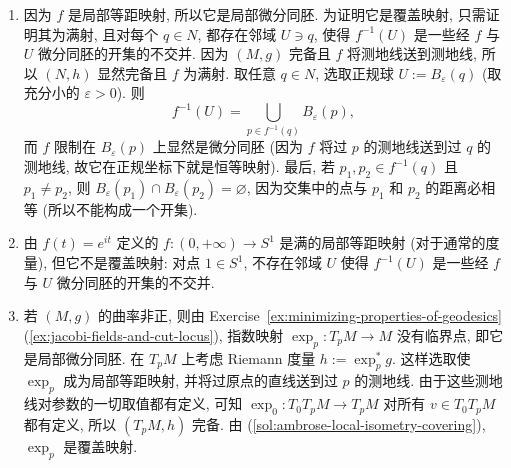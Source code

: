 \begin{description}[font=\normalfont,leftmargin=2em,labelwidth=1.5em]
\begin{enumerate}[label=(\alph*),ref=\alph*,leftmargin=*]
\item\label{sol:ambrose-local-isometry-covering} 因为 $f$ 是局部等距映射, 所以它是局部微分同胚. 为证明它是覆盖映射, 只需证明其为满射, 且对每个 $q\in N$, 都存在邻域 $U\ni q$, 使得 $f^{-1}(U)$ 是一些经 $f$ 与 $U$ 微分同胚的开集的不交并. 因为 $(M,g)$ 完备且 $f$ 将测地线送到测地线, 所以 $(N,h)$ 显然完备且 $f$ 为满射. 取任意 $q\in N$, 选取正规球 $U:=B_\varepsilon(q)$ (取充分小的 $\varepsilon>0$). 则
\[
  f^{-1}(U)=\bigcup_{p\in f^{-1}(q)}B_\varepsilon(p),
\]
而 $f$ 限制在 $B_\varepsilon(p)$ 上显然是微分同胚 (因为 $f$ 将过 $p$ 的测地线送到过 $q$ 的测地线, 故它在正规坐标下就是恒等映射). 最后, 若 $p_1,p_2\in f^{-1}(q)$ 且 $p_1\ne p_2$, 则 $B_\varepsilon(p_1)\cap B_\varepsilon(p_2)=\varnothing$, 因为交集中的点与 $p_1$ 和 $p_2$ 的距离必相等 (所以不能构成一个开集).
\item 由 $f(t)=e^{it}$ 定义的 $f:(0,+\infty)\to S^1$ 是满的局部等距映射 (对于通常的度量), 但它不是覆盖映射: 对点 $1\in S^1$, 不存在邻域 $U$ 使得 $f^{-1}(U)$ 是一些经 $f$ 与 $U$ 微分同胚的开集的不交并.
\item 若 $(M,g)$ 的曲率非正, 则由 Exercise~\ref{ex:minimizing-properties-of-geodesics}(\ref{ex:jacobi-fields-and-cut-locus}), 指数映射 $\exp_p:T_pM\to M$ 没有临界点, 即它是局部微分同胚. 在 $T_pM$ 上考虑 Riemann 度量 $h:=\exp_p^*g$. 这样选取使 $\exp_p$ 成为局部等距映射, 并将过原点的直线送到过 $p$ 的测地线. 由于这些测地线对参数的一切取值都有定义, 可知 $\exp_0:T_0T_pM\to T_pM$ 对所有 $v\in T_0T_pM$ 都有定义, 所以 $(T_pM,h)$ 完备. 由 (\ref{sol:ambrose-local-isometry-covering}), $\exp_p$ 是覆盖映射.
\end{enumerate}
\end{description}

